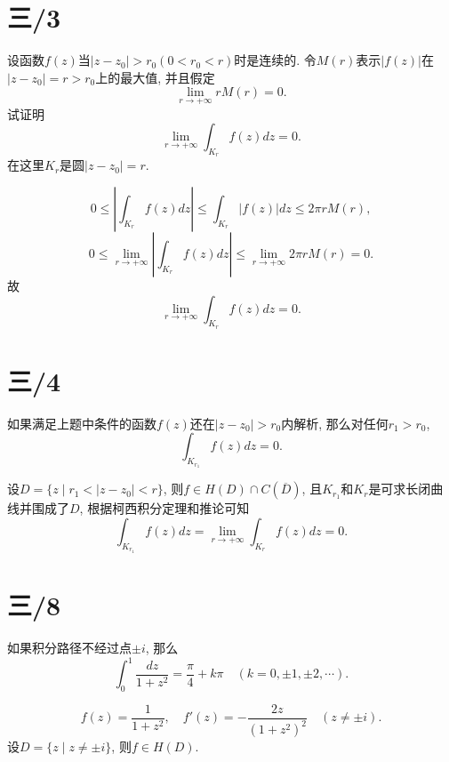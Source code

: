 \documentclass[11pt,a4paper]{article}
\author{刘逸灏 (515370910207)}
\begin{document}
\maketitle

\section{三/3}
\begin{problem}
  设函数$f(z)$当$|z-z_0|>r_0(0<r_0<r)$时是连续的. 令$M(r)$表示$|f(z)|$在$|z-z_0|=r>r_0$上的最大值, 并且假定
  $$\lim_{r\to+\infty} rM(r)=0.$$
  试证明
  $$\lim_{r\to+\infty}\int_{K_r}f(z)dz=0.$$
  在这里$K_r$是圆$|z-z_0|=r$.
\end{problem}

$$0\leqslant\left|\int_{K_r}f(z)dz\right|\leqslant\int_{K_r}|f(z)|dz\leqslant2\pi rM(r),$$
$$0\leqslant\lim_{r\to+\infty}\left|\int_{K_r}f(z)dz\right|\leqslant\lim_{r\to+\infty}2\pi rM(r)=0.$$
故$$\lim_{r\to+\infty}\int_{K_r}f(z)dz=0.$$

\section{三/4}
\begin{problem}
  如果满足上题中条件的函数$f(z)$还在$|z-z_0|>r_0$内解析, 那么对任何$r_1>r_0$,
  $$\int_{K_{r_1}}f(z)dz=0.$$
\end{problem}

设$D=\{z\mid r_1<|z-z_0|<r\}$, 则$f\in H(D)\cap C(\overline{D})$, 且$K_{r_1}$和$K_r$是可求长闭曲线并围成了$D$, 根据柯西积分定理和推论可知
$$\int_{K_{r_1}}f(z)dz=\lim_{r\to+\infty}\int_{K_r}f(z)dz=0.$$

\section{三/8}
\begin{problem}
  如果积分路径不经过点$\pm i$, 那么
  $$\int_0^1\frac{dz}{1+z^2}=\frac{\pi}{4}+k\pi\quad(k=0,\pm1,\pm2,\cdots).$$
\end{problem}

$$f(z)=\frac{1}{1+z^2},\quad f'(z)=-\frac{2z}{(1+z^2)^2}\quad (z\neq\pm i).$$
设$D=\{z\mid z\neq\pm i\}$, 则$f\in H(D)$.
\end{document}
